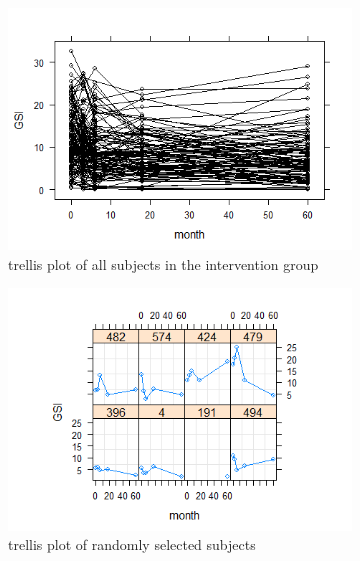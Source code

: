 \begin{figure}[t]
\begin{subfigure}{.33\textwidth}
  \centering
  \includegraphics[width=1\linewidth]{../../plots/trellis_treatment.png}
  \caption{trellis plot of all subjects in the intervention group}
  \label{fig:4a}
\end{subfigure}
\begin{subfigure}{.33\textwidth}
  \centering
  \includegraphics[width=1\linewidth]{../../plots/trellis_subset_treatment.png}
  \caption{trellis plot of randomly selected subjects}
  \label{fig:4b}
\end{subfigure}
\begin{subfigure}{.33\textwidth}
  \centering

\end{subfigure}
\end{figure}

